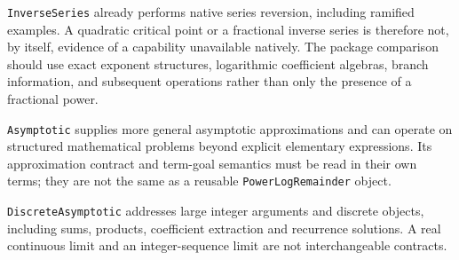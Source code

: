 \documentclass[11pt,letterpaper]{article}
\newcommand{\code}[1]{\nolinkurl{#1}}
\begin{document}
\code{InverseSeries} already performs native series reversion, including
ramified examples. A quadratic critical point or a fractional inverse series
is therefore not, by itself, evidence of a capability unavailable natively.
The package comparison should use exact exponent structures, logarithmic
coefficient algebras, branch information, and subsequent operations rather
than only the presence of a fractional power. \cite{wl-inverseseries}

\code{Asymptotic} supplies more general asymptotic approximations and can
operate on structured mathematical problems beyond explicit elementary
expressions. Its approximation contract and term-goal semantics must be
read in their own terms; they are not the same as a reusable
\code{PowerLogRemainder} object. \cite{wl-asymptotic}

\code{DiscreteAsymptotic} addresses large integer arguments and discrete
objects, including sums, products, coefficient extraction and recurrence
solutions. A real continuous limit and an integer-sequence limit are not
interchangeable contracts. \cite{wl-discrete}

\end{document}

